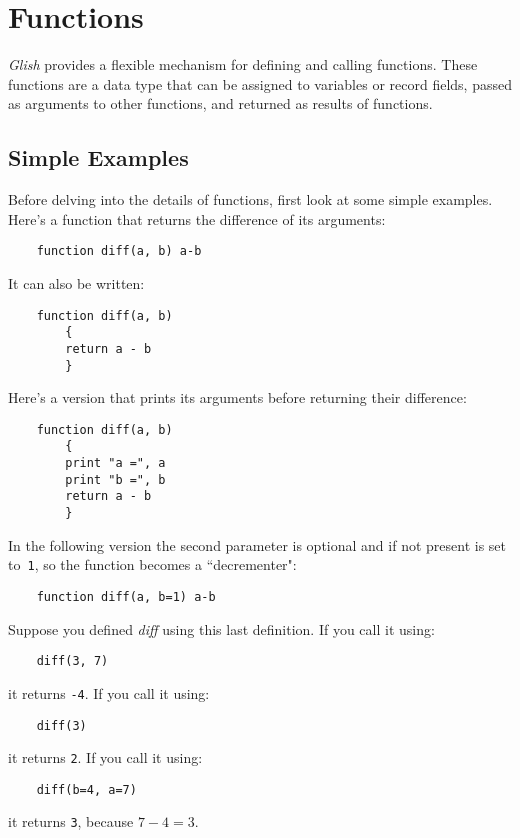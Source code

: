 
\chapter{Functions}
\label{functions}

{\em Glish} provides a flexible mechanism for defining and calling functions.
These functions are a data type that  can be assigned to variables or
record fields, passed as arguments to other functions, and returned as results
of functions.

\section{Simple Examples}

Before delving into the details of functions, first look at some
simple examples.  Here's a function that returns the difference
of its arguments:
\begin{verbatim}
    function diff(a, b) a-b
\end{verbatim}
It can also be written:
\begin{verbatim}
    function diff(a, b)
        {
        return a - b
        }
\end{verbatim}
Here's a version that prints its arguments before returning their difference:
\begin{verbatim}
    function diff(a, b)
        {
        print "a =", a
        print "b =", b
        return a - b
        }
\end{verbatim}
In the following version the second parameter is optional and if not
present is set to~{\tt 1}, so the function becomes a ``decrementer":
\begin{verbatim}
    function diff(a, b=1) a-b
\end{verbatim}

Suppose you defined {\em diff} using this last definition.  If
you call it using:
\begin{verbatim}
    diff(3, 7)
\end{verbatim}
it returns {\tt -4}.  If you call it using:
\begin{verbatim}
    diff(3)
\end{verbatim}
it returns {\tt 2}.  If you call it using:
\begin{verbatim}
    diff(b=4, a=7)
\end{verbatim}
it returns {\tt 3}, because  $7-4 = 3$.

